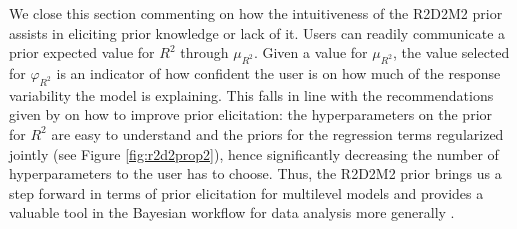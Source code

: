 We close this section commenting on how the intuitiveness of the R2D2M2 prior assists in eliciting prior knowledge or lack of it. Users can readily communicate a prior expected value for $R^2$ through $\mu_{R^2}$. Given a value for $\mu_{R^2}$, the value selected for $\varphi_{R^2}$ is an indicator of how confident the user is on how much of the response variability the model is explaining. This falls in line with the recommendations given by \cite{prioreli} on how to improve prior elicitation: the hyperparameters on the prior for $R^2$ are easy to understand and the priors for the regression terms regularized jointly (see Figure \ref{fig:r2d2prop2}), hence significantly decreasing the number of hyperparameters to the user has to choose. Thus, the R2D2M2 prior brings us a step forward in terms of prior elicitation for multilevel models and provides a valuable tool in the Bayesian workflow for data analysis more generally \citep{bayesianworkflow}.
